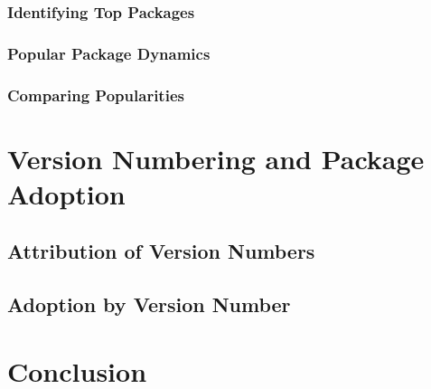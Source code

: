 \documentclass[10pt,conference]{IEEEtran}
\begin{document}
\subsubsection{Identifying Top Packages}

\subsubsection{Popular Package Dynamics}

\subsubsection{Comparing Popularities}

\section{Version Numbering and Package Adoption}

\subsection{Attribution of Version Numbers}

\subsection{Adoption by Version Number}

\section{Conclusion}
\end{document}
